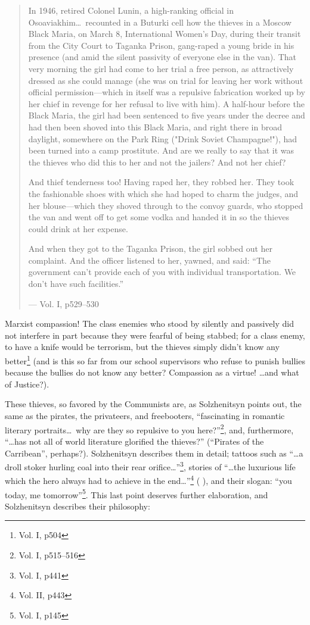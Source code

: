 \documentclass{article}
\begin{document}
\begin{quote}
In 1946, retired Colonel Lunin, a high-ranking official in Osoaviakhim\ldots~recounted in a Buturki cell how the thieves in a Moscow Black Maria, on March 8, International Women's Day, during their transit from the City Court to Taganka Prison, gang-raped a young bride in his presence (and amid the silent passivity of everyone else in the van).  That very morning the girl had come to her trial a free person, as attractively dressed as she could manage (she was on trial for leaving her work without official permission---which in itself was a repulsive fabrication worked up by her chief in revenge for her refusal to live with him).  A half-hour before the Black Maria, the girl had been sentenced to five years under the decree and had then been shoved into this Black Maria, and right there in broad daylight, somewhere on the Park Ring ("Drink Soviet Champagne!"), had been turned into a camp prostitute.  And are we really to say that it was the thieves who did this to her and not the jailers?  And not her chief?

And thief tenderness too!  Having raped her, they robbed her.  They took the fashionable shoes with which she had hoped to charm the judges, and her blouse---which they shoved through to the convoy guards, who stopped the van and went off to get some vodka and handed it in so the thieves could drink at her expense.

And when they got to the Taganka Prison, the girl sobbed out her complaint.  And the officer listened to her, yawned, and said: ``The government can't provide each of you with individual transportation.  We don't have such facilities.''

--- Vol. I, p529--530
\end{quote}

Marxist compassion!  The class enemies who stood by silently and passively did not interfere in part because they were fearful of being stabbed; for a class enemy, to have a knife would be terrorism, but the thieves simply didn't know any better\footnote{Vol. I, p504} (and is this so far from our school supervisors who refuse to punish bullies because the bullies do not know any better?  Compassion as a virtue!  \ldots and what of Justice?).

These thieves, so favored by the Communists are, as Solzhenitsyn points out, the same as the pirates, the privateers, and freebooters, ``fascinating in romantic literary portraits\ldots~why are they so repulsive to you here?''\footnote{Vol. I, p515--516}, and, furthermore, ``\ldots has not all of world literature glorified the thieves?'' (``Pirates of the Carribean'', perhaps?).  Solzhenitsyn describes them in detail; tattoos such as ``\ldots a droll stoker hurling coal into their rear orifice\ldots''\footnote{Vol. I, p441}, stories of ``\ldots the luxurious life which the hero always had to achieve in the end\ldots''\footnote{Vol. II, p443} ( ), and their slogan: ``you today, me tomorrow''\footnote{Vol. I, p145}.  This last point deserves further elaboration, and Solzhenitsyn describes their philosophy:
\end{document}
